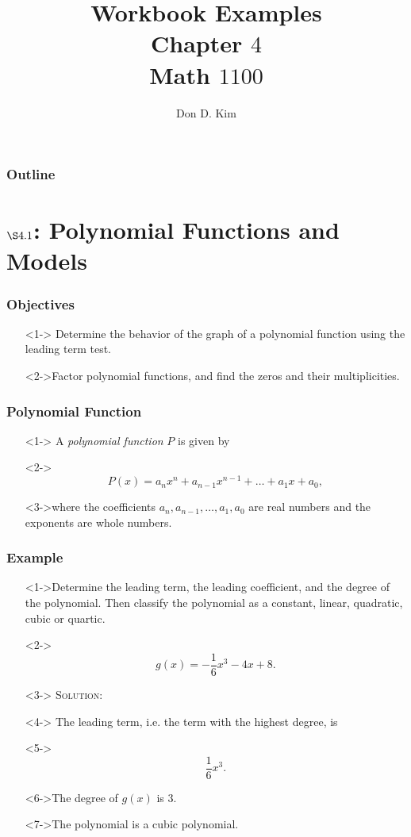 \documentclass{beamer}
\title{Workbook Examples \\ Chapter $4$ \\ Math $1100$}
\author{Don D. Kim}
\date{\datefmt{\year}{\month}{\day}}
\begin{document}
\begin{frame}
	\titlepage
\end{frame}

\begin{frame}
	\frametitle{Outline}
	\tableofcontents
\end{frame}

\section{$\S 4.1$: Polynomial Functions and Models} 

\begin{frame}
	\frametitle{Objectives} 
	\begin{enumerate}
		\item[]<1-> Determine the behavior of the graph of a polynomial function using the leading term test. 
		\item[]<2->Factor polynomial functions, and find the zeros and their multiplicities.  
	\end{enumerate}
\end{frame}

\begin{frame}
	\frametitle{Polynomial Function} 
	\begin{enumerate}
		\item[]<1-> A \emph{polynomial function} $P$ is given by 
		\item[]<2-> 
		\[ 
			P(x)=a_{n}x^{n}+a_{n-1}x^{n-1}+\dots+a_{1}x+a_{0},
		\]
		\item[]<3->where the coefficients $a_{n}, a_{n-1}, \dots, a_{1}, a_{0}$ are real numbers and the exponents are whole numbers. 
	\end{enumerate}
\end{frame}

\begin{frame}
	\frametitle{Example} 
	\begin{enumerate}
		\item[]<1->Determine the leading term, the leading coefficient, and the degree of the polynomial.  Then classify the polynomial as a constant, linear, quadratic, cubic or quartic.  
		\item[]<2-> 
		\[
			g(x)=-\frac{1}{6}x^{3}-4x+8. 
		\]
		\item[]<3-> \textsc{Solution:} 
		\item[]<4-> The leading term, i.e. the term with the highest degree, is  
		\item[]<5-> \[ \frac{1}{6}x^{3}. \]
		\item[]<6->The degree of $g(x)$ is $3$.  
		\item[]<7->The polynomial is a cubic polynomial.  
	\end{enumerate}
\end{frame}
\end{document}
